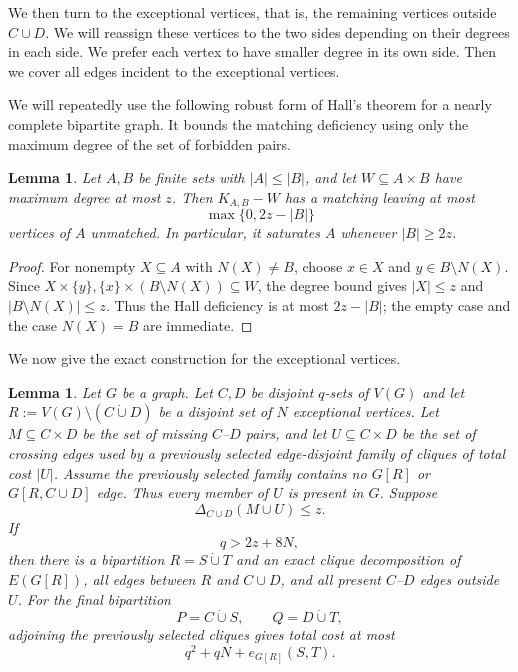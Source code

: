 \documentclass[11pt]{article}
\numberwithin{equation}{section}
\newtheorem{lemma}[theorem]{Lemma}
\theoremstyle{remark}
\newcommand{\dotcupunion}{\mathbin{\dot\cup}}
\begin{document}
We then turn to the exceptional vertices, that is, the remaining vertices outside \(C\cup D\).
We will reassign these vertices to the two sides depending on their degrees in each side. We prefer each vertex to have smaller degree in its own side.
Then we cover all edges incident to the exceptional vertices.

We will repeatedly use the following robust form of Hall's theorem for a nearly complete
bipartite graph.  It bounds the matching deficiency using only the maximum degree of the set of forbidden pairs.

\begin{lemma}
  \label{dec:lem:hall}
Let \(A,B\) be finite sets with \(|A|\le |B|\), and let
\(W\subseteq A\times B\) have maximum degree at most \(z\).
Then \(K_{A,B}-W\) has a matching leaving at most
\begin{equation*}
  \max\{0,2z-|B|\}
\end{equation*}
vertices of \(A\) unmatched.  In particular, it saturates \(A\) whenever
\(|B|\ge2z\).
\end{lemma}

\begin{proof}
For nonempty \(X\subseteq A\) with \(N(X)\ne B\), choose
\(x\in X\) and \(y\in B\setminus N(X)\).  Since
\(X\times\{y\},\{x\}\times(B\setminus N(X))\subseteq W\), the degree
bound gives \(|X|\le z\) and \(|B\setminus N(X)|\le z\).  Thus the Hall
deficiency is at most \(2z-|B|\); the empty case and the case \(N(X)=B\)
are immediate.
\end{proof}

We now give the exact construction for the exceptional vertices.

\begin{lemma}
  \label{dec:lem:exceptional-extension}
Let \(G\) be a graph. Let \(C,D\) be disjoint \(q\)-sets of \(V(G)\) and let \(R:=V(G)\setminus(C\dotcupunion D)\) be a disjoint set of \(N\)
exceptional vertices.
Let \(M\subseteq C\times D\) be
the set of missing \(C\)--\(D\) pairs, and let
\(U\subseteq C\times D\) be the set of crossing edges used by a
previously selected edge-disjoint family of cliques of total cost
\(|U|\). Assume the previously selected family contains no \(G[R]\) or \(G[R, C\cup D]\) edge.  Thus every member of \(U\) is present in \(G\).
Suppose
\begin{equation*}
  \Delta_{C\cup D}(M\cup U)\le z.
\end{equation*}
If
\begin{equation*}
  q>2z+8N,
\end{equation*}
then there is a bipartition \(R=S\dotcupunion T\) and an exact clique
decomposition of \(E(G[R])\), all edges between \(R\) and \(C\cup D\), and
all present \(C\)--\(D\) edges outside \(U\).  For the final bipartition
\begin{equation*}
  P=C\dotcupunion S,\qquad Q=D\dotcupunion T,
\end{equation*}
adjoining the previously selected cliques gives total cost at most
\begin{equation*}
  q^2+qN+e_{G[R]}(S,T).
\end{equation*}
\end{lemma}
\end{document}
